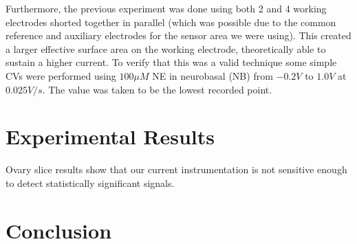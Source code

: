 \documentclass[twocolumn]{article}
\begin{document}
Furthermore, the previous experiment was done using both 2 and 4 working electrodes shorted together in parallel (which was possible due to the common reference and auxiliary electrodes for the sensor area we were using). This created a larger effective surface area on the working electrode, theoretically able to sustain a higher current. To verify that this was a valid technique some simple CVs were performed using $100\mu M$ NE in neurobasal (NB) from $-0.2V$ to $1.0V$ at $0.025V/s$. The value was taken to be the lowest recorded point.

\section{Experimental Results}

Ovary slice results show that our current instrumentation is not sensitive enough to detect statistically significant signals.

\section{Conclusion}

\end{document}
